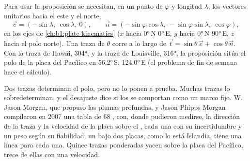 Para usar la proposición se necesitan, en un punto de  $\varphi$ y longitud
$\lambda$, los vectores unitarios hacia el este y el norte,
\[
  \vec e = (-\sin\lambda,\ \cos\lambda,\ 0),\qquad
  \vec n = (-\sin\varphi\cos\lambda,\ -\sin\varphi\sin\lambda,\ \cos\varphi),
\]
en los ejes de \cref{ch:b1:plate-kinematics} ($x$ hacia \ang{0}\,N \ang{0}\,E, $y$ hacia \ang{0}\,N \ang{90}\,E, $z$ hacia el polo norte). Una traza de
 $\theta$ corre a lo largo de $\vec t = \sin\theta\,\vec e +
\cos\theta\,\vec n$. Con la traza de Hawái,  \ang{304}, y la traza de Louisville,  \ang{316}, la proposición sitúa el polo de la placa del
Pacífico en \ang{56.2}\,S, \ang{124.0}\,E (el problema de fin de semana hace el cálculo).

Dos trazas determinan el polo, pero no lo ponen a prueba. Muchas trazas lo sobredeterminan, y el desajuste dice si los  se comportan
como un marco fijo. W. Jason Morgan, que propuso las plumas profundas, y Jason Phipps Morgan compilaron en 2007 una tabla de 68 , con,
donde pudieron medirse, la dirección de la traza y la velocidad de la placa sobre el , cada una con su incertidumbre y un peso según su
fiabilidad; un  bajo dos placas, como lo está Islandia, tiene una línea para cada una. Quince trazas ponderadas yacen sobre la placa
del Pacífico, trece de ellas con una velocidad.

